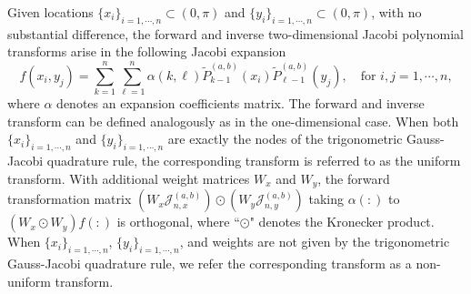 \documentclass[11pt]{article}
\begin{document}
Given locations $\{x_{i}\}_{i=1,\cdots,n} \subset (0,\pi)$ and $\{y_{i}\}_{i=1,\cdots,n} \subset (0,\pi)$, with no substantial difference, the forward and inverse two-dimensional Jacobi
polynomial transforms arise in the following Jacobi expansion
\begin{equation}
\label{eq:2Djac}
f(x_i,y_j) = \sum\limits_{k=1}^{n}\sum\limits_{\ell=1}^{n}\alpha(k,\ell)\tilde{P}_{k-1}^{(a,b)}(x_{i})\tilde{P}_{\ell-1}^{(a,b)}(y_{j}),\quad\text{for } i,j = 1,\cdots,n,
\end{equation}
where $\alpha$ denotes an expansion coefficients matrix. The forward and inverse transform can be defined analogously as in the one-dimensional case. When both $\{x_{i}\}_{i=1,\cdots,n}$ and $\{y_{i}\}_{i=1,\cdots,n}$ are exactly the nodes of the trigonometric Gauss-Jacobi quadrature rule, the corresponding transform is referred to as the uniform transform. With additional weight matrices $W_x$ and $W_y$, the forward transformation matrix $(W_{x}\mathcal{J}_{n,x}^{(a,b)})\odot (W_{y}\mathcal{J}_{n,y}^{(a,b)})$ taking $\alpha(:)$ to $(W_{x}\odot W_{y})f(:)$ is orthogonal, where ``$\odot$" denotes the Kronecker product. When $\{x_{i}\}_{i=1,\cdots,n}$, $\{y_{i}\}_{i=1,\cdots,n}$, and weights are not given by the trigonometric Gauss-Jacobi quadrature rule, we refer the corresponding transform as a non-uniform transform. 
\end{document}
